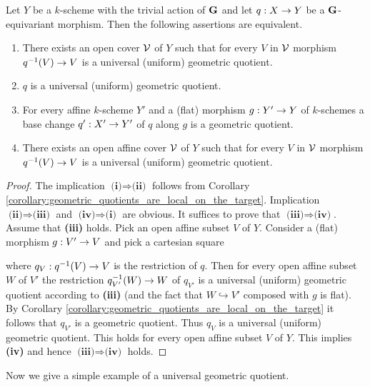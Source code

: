 \begin{theorem}\label{theorem:uniform_and_universal_geometric_quotients_are_local_and_affine_base_change_suffices}
Let $Y$ be a $k$-scheme with the trivial action of $\mathbf{G}$ and let $q:X\rightarrow Y$ be a $\mathbf{G}$-equivariant morphism. Then the following assertions are equivalent.
\begin{enumerate}[label=\emph{\textbf{(\roman*)}}, leftmargin=3.0em]
\item There exists an open cover ${\mathcal V}$ of $Y$ such that for every $V$ in ${\mathcal V}$ morphism $q^{-1}(V)\rightarrow V$ is a universal (uniform) geometric quotient.
\item $q$ is a universal (uniform) geometric quotient.
\item For every affine $k$-scheme $Y'$ and a (flat) morphism $g:Y'\rightarrow Y$ of $k$-schemes a base change $q':X'\rightarrow Y'$ of $q$ along $g$ is a geometric quotient.
\item There exists an open affine cover ${\mathcal V}$ of $Y$ such that for every $V$ in ${\mathcal V}$ morphism $q^{-1}(V)\rightarrow V$ is a universal (uniform) geometric quotient.
\end{enumerate}
\end{theorem}
\begin{proof}
The implication $\textbf{(i)}\Rightarrow \textbf{(ii)}$ follows from Corollary \ref{corollary:geometric_quotients_are_local_on_the_target}. Implication $\textbf{(ii)}\Rightarrow \textbf{(iii)}$ and $\textbf{(iv)}\Rightarrow \textbf{(i)}$ are obvious. It suffices to prove that $\textbf{(iii)}\Rightarrow \textbf{(iv)}$. Assume that \textbf{(iii)} holds. Pick an open affine subset $V$ of $Y$. Consider a (flat) morphism $g:V'\rightarrow V$ and pick a cartesian square 
\begin{center}
\end{center} 
where $q_V:q^{-1}(V)\rightarrow V$ is the restriction of $q$. Then for every open affine subset $W$ of $V'$ the restriction ${q}_{V'}^{-1}(W)\rightarrow W$ of $q_{V'}$ is a universal (uniform) geometric quotient according to \textbf{(iii)} (and the fact that $W\hookrightarrow V'$ composed with $g$ is flat). By Corollary \ref{corollary:geometric_quotients_are_local_on_the_target} it follows that $q_{V'}$ is a geometric quotient. Thus $q_V$ is a universal (uniform) geometric quotient. This holds for every open affine subset $V$ of $Y$. This implies \textbf{(iv)} and hence $\textbf{(iii)}\Rightarrow \textbf{(iv)}$ holds.
\end{proof}
\noindent
Now we give a simple example of a universal geometric quotient.


